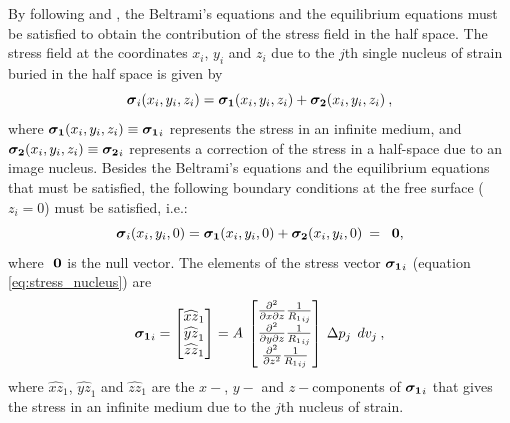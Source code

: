 \documentclass[journal abbreviation, manuscript]{copernicus}
\begin{document}
By following \cite{Sharma56} and \cite{Tempone10}, the Beltrami’s equations \citep{Beltrami} and the equilibrium equations must be satisfied to obtain the contribution of the stress field in the half space. 
The stress field  at the coordinates $x_i$, $y_i$ and $z_i$  due to the $j$th single nucleus of strain buried in the half space is given by
\begin{equation}
\mbox{\boldmath$\sigma$}_{i}(x_i,y_i,z_i) = \mbox{\boldmath$\sigma_{1}$}(x_i,y_i,z_i) + 
\mbox{\boldmath$\sigma_{2}$}(x_i,y_i,z_i) \: ,
\label{eq:stress_nucleus}
\end{equation}
where $\mbox{\boldmath$\sigma_{1}$}(x_i,y_i,z_i) \equiv \mbox{\boldmath$\sigma_{1}$}_{i}$ represents the stress in an infinite medium, and 
$\mbox{\boldmath$\sigma_{2}$}(x_i,y_i,z_i) \equiv \mbox{\boldmath$\sigma_{2}$}_{i}$ represents a correction of the stress in a half-space due to an image nucleus.
Besides the Beltrami’s equations \citep{Beltrami} and the equilibrium equations that must be satisfied, the following boundary conditions at the free surface ($z_i = 0$) must be satisfied, i.e.:
\begin{equation}
\mbox{\boldmath$\sigma$}_{i}(x_i,y_i,0) = \mbox{\boldmath$\sigma_{1}$}(x_i,y_i,0) + 
\mbox{\boldmath$\sigma_{2}$}(x_i,y_i,0) \: = \: \mbox{ \boldmath$0$},
\label{eq:null_stress}
\end{equation}
where $\mbox{ \boldmath$0$}$ is the null vector.
The elements  of the stress vector $\mbox{\boldmath$\sigma_{1}$}_{i}$ (equation \ref{eq:stress_nucleus}) are
\begin{equation}
\mbox{\boldmath$\sigma_{1}$}_{i}  = 
\begin{bmatrix} 
{\widehat{xz}_{1}} \\
{\widehat{yz}_{1}}  \\
{\widehat{zz}_{1}} 
\end{bmatrix}
 = A  \: 
\begin{bmatrix} 
\frac{\partial^{2} }{\partial x \partial z} {\frac{1}{{R_1}_{ij}}}  \\
\frac{\partial^{2} }{\partial y \partial z} {\frac{1}{{R_1}_{ij}}}  \\
\frac{\partial^{2} }{\partial z^{2}} {\frac{1}{{R_1}_{ij}}} 
\end{bmatrix}
 \: \Delta p_{j} \: \:dv_j \:  ,  
\label{eq:nucleus-stress1-vector}
\end{equation}
where ${\widehat{xz}_{1}}$, ${\widehat{yz}_{1}}$ and ${\widehat{zz}_{1}}$ are the $x-$, $y-$  and $z-$components
of  $\mbox{\boldmath$\sigma_{1}$}_{i}$ that gives the stress in an infinite medium due to the $j$th nucleus of strain.
\end{document}
